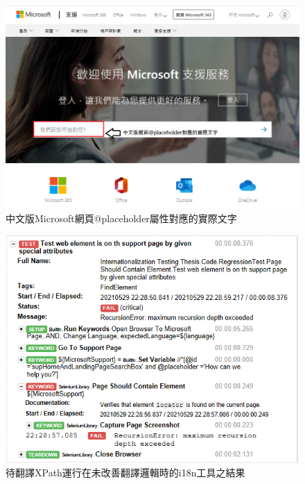 \begin{figure}[H]
\centering
\includegraphics[width= .9\textwidth]{../論文截圖/4-2-2 畫面上@placeholder的實際文字.png}
\caption{中文版Microsoft網頁@placeholder屬性對應的實際文字\cite{microsoft}}
\label{中文版Microsoft網頁@placeholder屬性對應的實際文字}
\end{figure}

\begin{figure}[H]
\centering
\includegraphics[width= .8\textwidth]{../論文截圖/4-2-3 @placeholder運行在第一版i18n.png}
\caption{待翻譯XPath運行在未改善翻譯邏輯時的i18n工具之結果}
\label{待翻譯XPath運行在未改善翻譯邏輯時的i18n工具之結果}
\end{figure}

